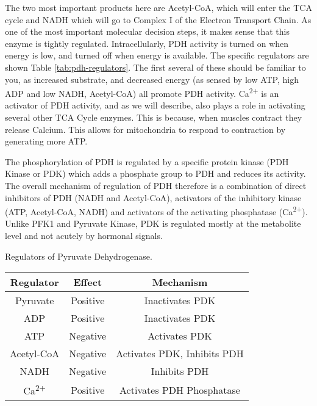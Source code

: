 \documentclass{tufte-handout}
\begin{document}
The two most important products here are Acetyl-CoA, which will enter the TCA cycle and NADH which will go to Complex I of the Electron Transport Chain.  As one of the most important molecular decision steps, it makes sense that this enzyme is tightly regulated.  Intracellularly, PDH activity is turned on when energy is low, and turned off when energy is available.  The specific regulators are shown Table \ref{tab:pdh-regulators}.  The first several of these should be familiar to you, as increased substrate, and decreased energy (as sensed by low ATP, high ADP and low NADH, Acetyl-CoA) all promote PDH activity.  Ca\textsuperscript{2+} is an activator of PDH activity, and as we will describe, also plays a role in activating several other TCA Cycle enzymes.  This is because, when muscles contract they release Calcium.  This allows for mitochondria to respond to contraction by generating more ATP.

  The phosphorylation of PDH is regulated by a specific protein kinase (PDH Kinase or PDK) which adds a phosphate group to PDH and reduces its activity.  The overall mechanism of regulation of PDH therefore is a combination of direct inhibitors of PDH (NADH and Acetyl-CoA), activators of the inhibitory kinase (ATP, Acetyl-CoA, NADH) and activators of the activating phosphatase (Ca\textsuperscript{2+}).  Unlike PFK1 and Pyruvate Kinase, PDK is regulated mostly at the metabolite level and not acutely by hormonal signals. 

\begin{margintable}
\centering
\caption{Regulators of Pyruvate Dehydrogenase.}
\label{tab:pdh-regulators}
\begin{tabular}{ccc}
\hline
\textbf {Regulator} & \textbf{Effect} &\textbf{Mechanism}  \\
\hline
Pyruvate & Positive & Inactivates PDK\\
ADP & Positive & Inactivates PDK\\
ATP & Negative & Activates PDK\\
Acetyl-CoA & Negative &  Activates PDK, Inhibits PDH\\
NADH & Negative & Inhibits PDH\\
Ca\textsuperscript{2+} &  Positive & Activates PDH Phosphatase \\
\hline
\end{tabular}
\end{margintable}
\end{document}
